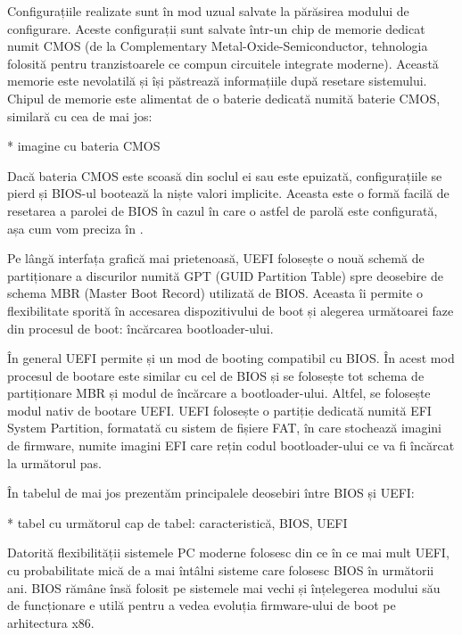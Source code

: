 Configurațiile realizate sunt în mod uzual salvate la părăsirea modului de
configurare. Aceste configurații sunt salvate într-un chip de memorie dedicat
numit CMOS  (de la
Complementary Metal-Oxide-Semiconductor, tehnologia folosită pentru
tranzistoarele ce compun circuitele integrate moderne). Această memorie este
nevolatilă și își păstrează informațiile după resetare sistemului. Chipul de
memorie este alimentat de o baterie dedicată numită baterie CMOS, similară cu
cea de mai jos:

* imagine cu bateria CMOS

Dacă bateria CMOS este scoasă din soclul ei sau este epuizată, configurațiile se
pierd și BIOS-ul bootează la niște valori implicite. Aceasta este o formă facilă
de resetarea a parolei de BIOS în cazul în care o astfel de parolă este
configurată, așa cum vom preciza în .

Pe lângă interfața grafică mai prietenoasă, UEFI folosește o nouă schemă de
partiționare a discurilor numită GPT  (GUID
Partition Table) spre deosebire de schema MBR 
(Master Boot Record) utilizată de BIOS. Aceasta îi permite o flexibilitate
sporită în accesarea dispozitivului de boot și alegerea următoarei faze din
procesul de boot: încărcarea bootloader-ului.

În general UEFI permite și un mod de booting compatibil cu BIOS. În acest mod
procesul de bootare este similar cu cel de BIOS și se folosește tot schema de
partiționare MBR și modul de încărcare a bootloader-ului. Altfel, se folosește
modul nativ de bootare UEFI. UEFI folosește o partiție dedicată numită EFI
System Partition, formatată cu sistem de fișiere FAT, în care stochează imagini
de firmware, numite imagini EFI care rețin codul bootloader-ului ce va fi
încărcat la următorul pas.

În tabelul de mai jos prezentăm principalele deosebiri între BIOS și UEFI:

* tabel cu următorul cap de tabel: caracteristică, BIOS, UEFI

Datorită flexibilității sistemele PC  moderne
folosesc din ce în ce mai mult UEFI, cu probabilitate mică de a mai întâlni
sisteme care folosesc BIOS în următorii ani. BIOS rămâne însă folosit pe
sistemele mai vechi și înțelegerea modului său de funcționare e utilă pentru a
vedea evoluția firmware-ului de boot pe arhitectura x86.

